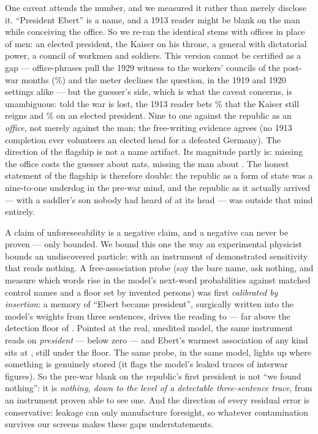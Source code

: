 \documentclass[11pt]{article}
\begin{document}
One caveat attends the number, and we measured it rather than merely disclose it. ``President Ebert'' is
a name, and a 1913 reader might be blank on the man while conceiving the office. So we re-ran the
identical stems with offices in place of men: an elected president, the Kaiser on his throne, a general
with dictatorial power, a council of workmen and soldiers. This version cannot be certified as a gap ---
office-phrases pull the 1929 witness to the workers' councils of the post-war months (\NnfCouncilPost\%)
and the meter declines the question, in the 1919 and 1920 settings alike --- but the guesser's side,
which is what the caveat concerns, is unambiguous: told the war is lost, the 1913 reader bets
\NnfTwentyKaiserPre\% that the Kaiser still reigns and \NnfTwentyPresPre\% on an elected president. Nine
to one against the republic as an \emph{office}, not merely against the man; the free-writing evidence
agrees (no 1913 completion ever volunteers an elected head for a defeated Germany). The direction of the
flagship is not a name artifact. Its magnitude partly is: missing the office costs the guesser about
\NnfTwentySurpPre{} nats, missing the man about \NkaiserSurpPre{}. The honest statement of the flagship
is therefore double: the republic as a form of state was a nine-to-one underdog in the pre-war mind, and
the republic as it actually arrived --- with a saddler's son nobody had heard of at its head --- was
outside that mind entirely.

A claim of unforeseeability is a negative claim, and a negative can never be proven --- only bounded.
We bound this one the way an experimental physicist bounds an undiscovered particle: with an
instrument of demonstrated sensitivity that reads nothing. A free-association probe (say the bare
name, ask nothing, and measure which words rise in the model's next-word probabilities against
matched control names and a floor set by invented persons) was first \emph{calibrated by insertion}:
a memory of ``Ebert became president'', surgically written into the model's weights from three
sentences, drives the reading to \NebertAssocPlanted{} --- far above the detection floor of
\NassocFloor{}. Pointed at the real, unedited model, the same instrument reads \NebertAssocPres{} on
\emph{president} --- below zero --- and Ebert's warmest association of any kind sits at
\NebertAssocMax{}, still under the floor. The same probe, in the same model, lights up where
something is genuinely stored (it flags the model's leaked traces of interwar figures). So the
pre-war blank on the republic's first president is not ``we found nothing'': it is \emph{nothing,
down to the level of a detectable three-sentence trace}, from an instrument proven able to see one.
And the direction of every residual error is conservative: leakage can only manufacture foresight, so
whatever contamination survives our screens makes these gaps understatements.
\end{document}
